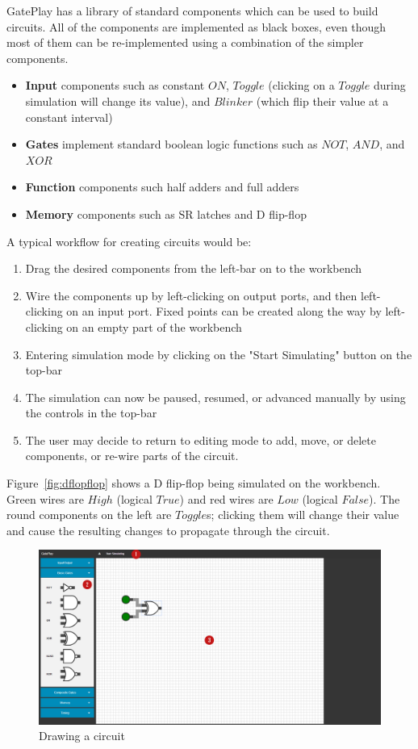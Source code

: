 GatePlay has a library of standard components which can be used to build circuits. All of the components are implemented as black boxes, even though most of them can be re-implemented using a combination of the simpler components.

\begin{itemize}
	\item \textbf{Input} components such as constant $ON$, $Toggle$ (clicking on a $Toggle$ during simulation will change its value), and $Blinker$ (which flip their value at a constant interval)
	\item \textbf{Gates} implement standard boolean logic functions such as $NOT$, $AND$, and $XOR$
	\item \textbf{Function} components such half adders and full adders
	\item \textbf{Memory} components such as SR latches and D flip-flop  
\end{itemize}

A typical workflow for creating circuits would be:

\begin{enumerate}
	\item Drag the desired components from the left-bar on to the workbench
	\item Wire the components up by left-clicking on output ports, and then left-clicking on an input port. Fixed points can be created along the way by left-clicking on an empty part of the workbench
	\item Entering simulation mode by clicking on the "Start Simulating" button on the top-bar
	\item The simulation can now be paused, resumed, or advanced manually by using the controls in the top-bar
	\item The user may decide to return to editing mode to add, move, or delete components, or re-wire parts of the circuit.
\end{enumerate}

Figure~\ref{fig:dflopflop} shows a D flip-flop being simulated on the workbench. Green wires are $High$ (logical $True$) and red wires are $Low$ (logical $False$). The round components on the left are $Toggle$s; clicking them will change their value and cause the resulting changes to propagate through the circuit.

\begin{figure}[p]
    \centering
    \includegraphics[width=\textheight,angle=90]{labelled.png}
    \caption{Drawing a circuit}
    \label{fig:interface}
\end{figure}

